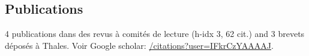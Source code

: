 \documentclass[10pt]{article} %
\begin{document}
\begin{paracol}{2}
\section{Publications}
4 publications dans des revus à comités de lecture (h-idx 3, 62 cit.) and 3 brevets
déposés à Thales. Voir Google scholar:
\href{https://scholar.google.fr/citations?user=IFkrCzYAAAAJ}{/citations?user=IFkrCzYAAAAJ}.
\medskip
%
%

\end{paracol}
\end{document}
